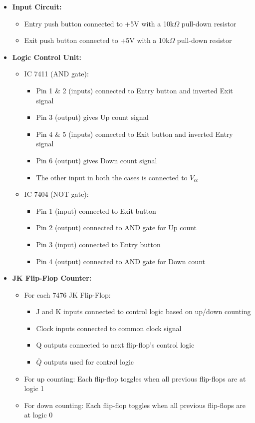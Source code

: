 \documentclass[a4paper,12pt]{article}
\begin{document}
\begin{itemize}
    \item \textbf{Input Circuit:}
    \begin{itemize}
        \item Entry push button connected to +5V with a 10k$\Omega$ pull-down resistor
        \item Exit push button connected to +5V with a 10k$\Omega$ pull-down resistor
    \end{itemize}
    
    \item \textbf{Logic Control Unit:}
    \begin{itemize}
        \item IC 7411 (AND gate): 
        \begin{itemize}
            \item Pin 1 \& 2 (inputs) connected to Entry button and inverted Exit signal
            \item Pin 3 (output) gives Up count signal
            \item Pin 4 \& 5 (inputs) connected to Exit button and inverted Entry signal
            \item Pin 6 (output) gives Down count signal
            \item The other input in both the cases is connected to $V_{cc}$
        \end{itemize}
        \item IC 7404 (NOT gate):
        \begin{itemize}
            \item Pin 1 (input) connected to Exit button
            \item Pin 2 (output) connected to AND gate for Up count
            \item Pin 3 (input) connected to Entry button
            \item Pin 4 (output) connected to AND gate for Down count
        \end{itemize}
    \end{itemize}
    
    \item \textbf{JK Flip-Flop Counter:}
    \begin{itemize}
        \item For each 7476 JK Flip-Flop:
        \begin{itemize}
            \item J and K inputs connected to control logic based on up/down counting
            \item Clock inputs connected to common clock signal
            \item Q outputs connected to next flip-flop's control logic
            \item $\overline{Q}$ outputs used for control logic
        \end{itemize}
        \item For up counting: Each flip-flop toggles when all previous flip-flops are at logic 1
        \item For down counting: Each flip-flop toggles when all previous flip-flops are at logic 0
    \end{itemize}
    

\end{itemize}
\end{document}

